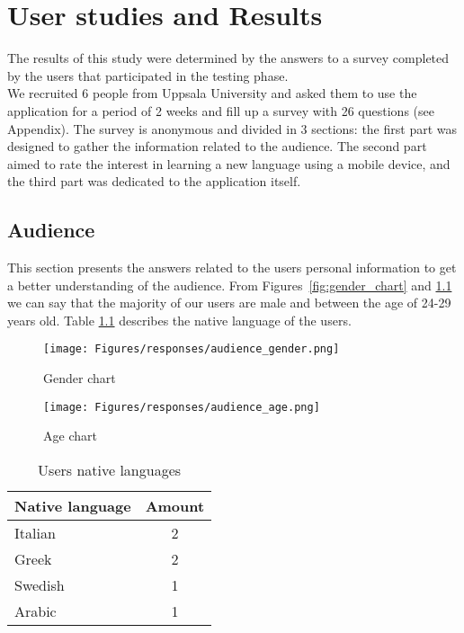 \chapter{User studies and Results}
\label{chap:results}

The results of this study were determined by the answers to a survey completed by the users that participated in the testing phase. \\
\noindent We recruited 6 people from Uppsala University and asked them to use the application for a period of 2 weeks and fill up a survey with 26 questions (see Appendix). The survey is anonymous and divided in 3 sections: the first part was designed to gather the information related to the audience. The second part aimed to rate the interest in learning a new language using a mobile device, and the third part was dedicated to the application itself. \\

\section{Audience}
\label{sub:Audience}

This section presents the answers related to the users personal information to get a better understanding of the audience. From Figures~\ref{fig:gender_chart} and \ref{fig:age_chart} we can say that the majority of our users are male and between the age of 24-29 years old.  Table \ref{table:native_languages} describes the native language of the users.

\begin{figure}[!ht]
	\centering
	\begin{minipage}{.5\textwidth}
		\centering
		\texttt{[image: Figures/responses/audience\_gender.png]}
		\caption{Gender chart}
		\label{fig:gender_chart}
	\end{minipage}%
	\begin{minipage}{.5\textwidth}
		\centering
		\texttt{[image: Figures/responses/audience\_age.png]}
		\caption{Age chart}
		\label{fig:age_chart}
	\end{minipage}
\end{figure}

\begin{table}[!ht]
    \centering
    \begin{tabular}{|l|c|}
        \hline
        \multicolumn{1}{|c|}{\textbf{Native language}} & \textbf{Amount} \\ \hline
        Italian                                        & 2               \\ \hline
        Greek                                          & 2               \\ \hline
        Swedish                                        & 1               \\ \hline
        Arabic                                         & 1               \\ \hline
    \end{tabular}
    \caption{Users native languages}
    \label{table:native_languages}
\end{table}

